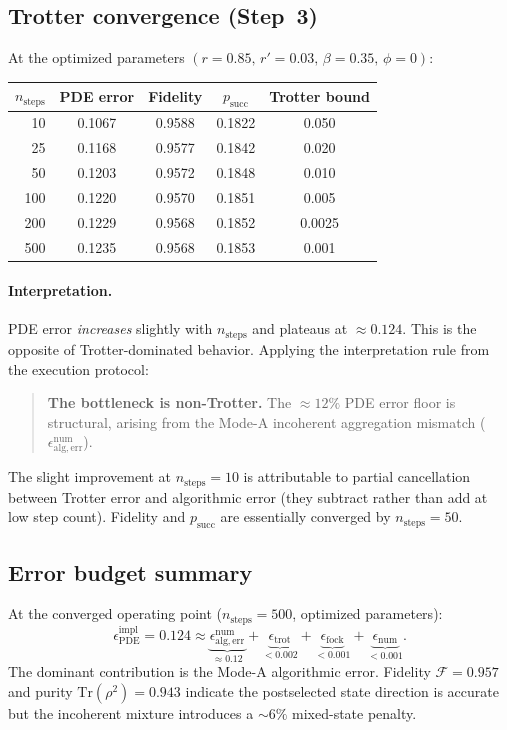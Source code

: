\documentclass[11pt]{article}
\begin{document}
\subsection{Trotter convergence (Step~3)}

At the optimized parameters $(r=0.85,\,r'=0.03,\,\beta=0.35,\,\phi=0)$:
\begin{center}
\begin{tabular}{rcccc}
\toprule
$n_{\mathrm{steps}}$ & PDE error & Fidelity & $p_{\mathrm{succ}}$ & Trotter bound \\
\midrule
 10  & 0.1067 & 0.9588 & 0.1822 & 0.050 \\
 25  & 0.1168 & 0.9577 & 0.1842 & 0.020 \\
 50  & 0.1203 & 0.9572 & 0.1848 & 0.010 \\
100  & 0.1220 & 0.9570 & 0.1851 & 0.005 \\
200  & 0.1229 & 0.9568 & 0.1852 & 0.0025 \\
500  & 0.1235 & 0.9568 & 0.1853 & 0.001 \\
\bottomrule
\end{tabular}
\end{center}

\paragraph{Interpretation.}
PDE error \emph{increases} slightly with $n_{\mathrm{steps}}$ and plateaus at $\approx 0.124$.
This is the opposite of Trotter-dominated behavior.
Applying the interpretation rule from the execution protocol:
\begin{quote}
\textbf{The bottleneck is non-Trotter.}
The $\approx 12\%$ PDE error floor is structural, arising from the
Mode-A incoherent aggregation mismatch ($\epsilon_{\mathrm{alg,err}}^{\mathrm{num}}$).
\end{quote}
The slight improvement at $n_{\mathrm{steps}}=10$ is attributable to partial cancellation
between Trotter error and algorithmic error (they subtract rather than add at low step count).
Fidelity and $p_{\mathrm{succ}}$ are essentially converged by $n_{\mathrm{steps}}=50$.

\subsection{Error budget summary}

At the converged operating point ($n_{\mathrm{steps}}=500$, optimized parameters):
\[
\epsilon_{\mathrm{PDE}}^{\mathrm{impl}} = 0.124
\approx
\underbrace{\epsilon_{\mathrm{alg,err}}^{\mathrm{num}}}_{\approx 0.12}
+ \underbrace{\epsilon_{\mathrm{trot}}}_{< 0.002}
+ \underbrace{\epsilon_{\mathrm{fock}}}_{< 0.001}
+ \underbrace{\epsilon_{\mathrm{num}}}_{< 0.001}.
\]
The dominant contribution is the Mode-A algorithmic error.
Fidelity $\mathcal{F}=0.957$ and purity $\mathrm{Tr}(\rho^2)=0.943$
indicate the postselected state direction is accurate but the
incoherent mixture introduces a $\sim 6\%$ mixed-state penalty.
\end{document}
